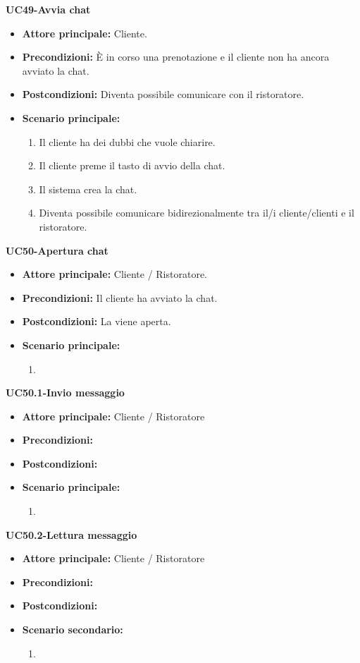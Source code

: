 
\textbf{UC49-Avvia chat}
\begin{itemize}
\item \textbf{Attore principale:} Cliente.
\item \textbf{Precondizioni:} È in corso una prenotazione e il cliente non ha ancora avviato la chat. %
\item \textbf{Postcondizioni:} Diventa possibile comunicare con il ristoratore.
\item \textbf{Scenario principale:}
\begin{enumerate}
    \item Il cliente ha dei dubbi che vuole chiarire.
    \item Il cliente preme il tasto di avvio della chat.
    \item Il sistema crea la chat.
    \item Diventa possibile comunicare bidirezionalmente tra il/i cliente/clienti e il ristoratore. 
\end{enumerate}
\end{itemize}

\textbf{UC50-Apertura chat}
\begin{itemize}
\item \textbf{Attore principale:} Cliente / Ristoratore.
\item \textbf{Precondizioni:} Il cliente ha avviato la chat.
\item \textbf{Postcondizioni:} La viene aperta. %
\item \textbf{Scenario principale:}
\begin{enumerate}
    \item 
\end{enumerate}
\end{itemize}

\textbf{UC50.1-Invio messaggio}
\begin{itemize}
\item \textbf{Attore principale:} Cliente / Ristoratore
\item \textbf{Precondizioni:}
\item \textbf{Postcondizioni:}
\item \textbf{Scenario principale:}
\begin{enumerate}
    \item
\end{enumerate}
\end{itemize}

\textbf{UC50.2-Lettura messaggio}
\begin{itemize}
\item \textbf{Attore principale:} Cliente / Ristoratore
\item \textbf{Precondizioni:}
\item \textbf{Postcondizioni:}
\item \textbf{Scenario secondario:}
\begin{enumerate}
    \item
\end{enumerate}
\end{itemize}
